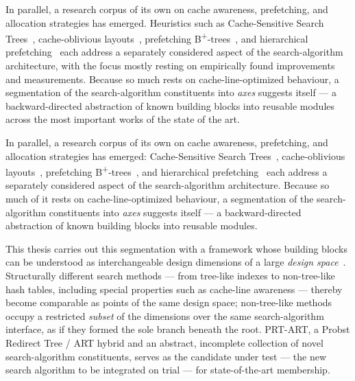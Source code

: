 \begin{nurlang}
In parallel, a research corpus of its own on cache awareness, prefetching, and allocation strategies
has emerged. Heuristics such as Cache-Sensitive Search Trees~\cite{rao1999css, rao2000csb},
cache-oblivious layouts~\cite{frigo1999cache}, prefetching B\textsuperscript{+}-trees~\cite{chen2001prefetch},
and hierarchical prefetching~\cite{zhang2025hierarchical} each address a separately considered aspect
of the search-algorithm architecture, with the focus mostly resting on empirically found improvements
and measurements. Because so much rests on cache-line-optimized behaviour, a segmentation of the
search-algorithm constituents into \emph{axes} suggests itself --- a backward-directed abstraction of
known building blocks into reusable modules across the most important works of the state of the art.
\end{nurlang}
\begin{nurkurz}
In parallel, a research corpus of its own on cache awareness, prefetching, and allocation strategies has
emerged: Cache-Sensitive Search Trees~\cite{rao1999css, rao2000csb}, cache-oblivious
layouts~\cite{frigo1999cache}, prefetching B\textsuperscript{+}-trees~\cite{chen2001prefetch}, and
hierarchical prefetching~\cite{zhang2025hierarchical} each address a separately considered aspect of the
search-algorithm architecture. Because so much of it rests on cache-line-optimized behaviour, a
segmentation of the search-algorithm constituents into \emph{axes} suggests itself --- a backward-directed
abstraction of known building blocks into reusable modules.
\end{nurkurz}

This thesis carries out this segmentation with a framework whose building blocks can be understood as
interchangeable design dimensions of a large \emph{design space}~\cite{idreos2018periodic, idreos2018datacalculator}.
Structurally different search methods --- from tree-like indexes to non-tree-like hash tables, including
special properties such as cache-line awareness --- thereby become comparable as points of the same
design space; non-tree-like methods occupy a restricted \emph{subset} of the dimensions over the same
search-algorithm interface, as if they formed the sole branch beneath the root. PRT-ART, a Probst
Redirect Tree / ART hybrid and an abstract, incomplete collection of novel search-algorithm
constituents, serves as the candidate under test --- the new search algorithm to be integrated on trial --- for state-of-the-art membership.

